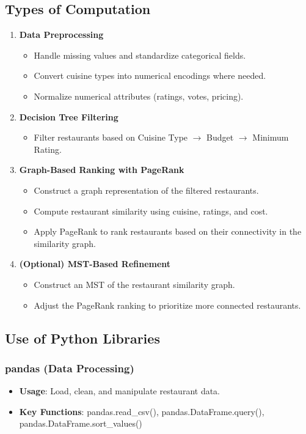 \documentclass[fontsize=11pt]{article}
\begin{document}
\subsection*{Types of Computation}
\begin{enumerate}
    \item \textbf{Data Preprocessing}
    \begin{itemize}
        \item Handle missing values and standardize categorical fields.
        \item Convert cuisine types into numerical encodings where needed.
        \item Normalize numerical attributes (ratings, votes, pricing).
    \end{itemize}
    \item \textbf{Decision Tree Filtering}
    \begin{itemize}
        \item Filter restaurants based on Cuisine Type $\rightarrow$ Budget $\rightarrow$ Minimum Rating.
    \end{itemize}
    \item \textbf{Graph-Based Ranking with PageRank}
    \begin{itemize}
        \item Construct a graph representation of the filtered restaurants.
        \item Compute restaurant similarity using cuisine, ratings, and cost.
        \item Apply PageRank to rank restaurants based on their connectivity in the similarity graph.
    \end{itemize}
    \item \textbf{(Optional) MST-Based Refinement}
    \begin{itemize}
        \item Construct an MST of the restaurant similarity graph.
        \item Adjust the PageRank ranking to prioritize more connected restaurants.
    \end{itemize}
\end{enumerate}

\subsection*{Use of Python Libraries}
\subsubsection*{pandas (Data Processing)}
\begin{itemize}
    \item \textbf{Usage}: Load, clean, and manipulate restaurant data.
    \item \textbf{Key Functions}: pandas.read\_csv(), pandas.DataFrame.query(), pandas.DataFrame.sort\_values()
\end{itemize}
\end{document}
